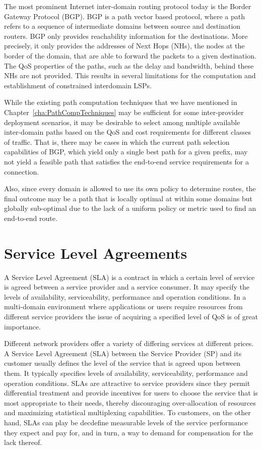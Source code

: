 The most prominent Internet inter-domain routing protocol today is the Border Gateway Protocol (BGP). BGP is a path vector based protocol, where a path refers to a sequence of intermediate domains between source and destination routers. BGP only provides reachability information for the destinations. More precisely, it only provides the addresses of Next Hops (NHs), the nodes at the border of the domain, that are able to forward the packets to a given destination. The QoS properties of the paths, such as the delay and bandwidth, behind these NHs are not provided. This results in several limitations for the computation and establishment of constrained interdomain LSPs.

While the existing path computation techniques that we have mentioned in Chapter~\ref{cha:PathCompTechniques}  may be sufficient for some inter-provider deployment scenarios, it may be desirable to select among multiple available inter-domain paths based on the QoS and cost requirements for different classes of traffic. That is, there may be cases in which the current path selection capabilities of BGP, which yield only a single best path for a given prefix, may not yield a feasible path that satisfies the end-to-end service requirements for a connection.

Also, since every domain is allowed to use its own policy to determine routes, the final outcome may be a path that is locally optimal at within some domains but globally sub-optimal due to the lack of a uniform policy or metric used to find an end-to-end route.

\section{Service Level Agreements}
A Service Level Agreement (SLA) is a contract in which a certain level of service is agreed between a service provider and a service consumer. It may specify the levels of availability, serviceability, performance and operation conditions.
In a multi-domain environment where applications or users require resources from different service providers the issue of acquiring a specified level of QoS is of great importance.

Different network providers offer a variety of differing services at different prices. A Service Level Agreement (SLA) between the Service Provider (SP) and its customer usually defines the level of the service that is agreed upon between them. It typically specifies levels of availability, serviceability, performance and operation conditions. SLAs are attractive to service providers since they permit differential treatment and provide incentives for users to choose the service that is most appropriate to their needs, thereby discouraging over-allocation of resources and maximizing statistical multiplexing capabilities. To customers, on the other hand, SLAs can play be decdefine measurable levels of the service performance they expect and pay for, and in turn, a way to demand for compensation for the lack thereof.

